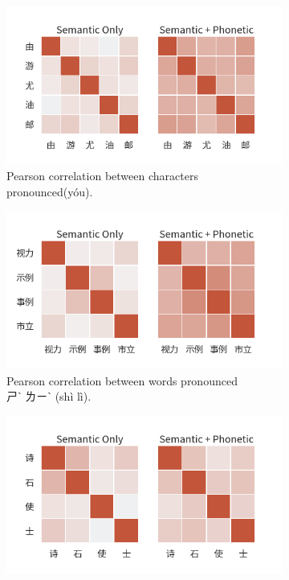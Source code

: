 \vspace{-1em}
\begin{figure}[h]
    \centering
    \begin{subfigure}[b]{0.46\textwidth}
        \centering
        \includegraphics[width=\textwidth]{../images/corr_zh1.png}
        \caption{Pearson correlation between characters pronounced (yóu).}
        \label{fig:corr_zh1}
    \end{subfigure}
    \hspace{2em}
    \begin{subfigure}[b]{0.46\textwidth}
        \centering
        \includegraphics[width=\textwidth]{../images/corr_zh2.png}
        \caption{Pearson correlation between words pronounced\enspace\\ㄕˋ ㄌㄧˋ (shì lì).}
        \label{fig:corr_zh2}
    \end{subfigure}
    \begin{subfigure}[b]{0.46\textwidth}
        \centering
        \includegraphics[width=\textwidth]{../images/corr_zh3.png}

\end{subfigure}
\end{figure}
